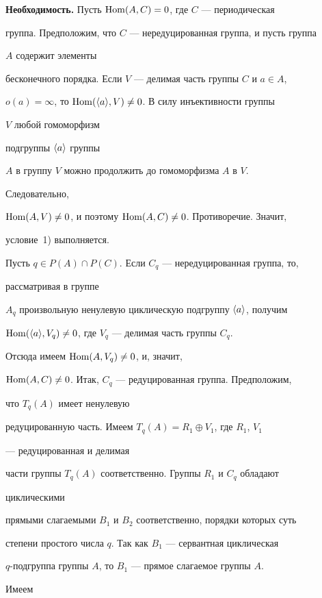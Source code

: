 \begin{pf} 


{\bf Необходимость.} Пусть $\operatorname{Hom}(A,C)=0$, где $C$ --- периодическая 


группа. Предположим, что $C$ --- нередуцированная группа, и пусть группа 


$A$ содержит элементы 


бесконечного порядка. Если $V$ --- делимая часть группы $C$ и $a\in A$, 


$o(a)=\infty$, то $\operatorname{Hom}(\langle a\rangle,V)\ne0$. В силу инъективности группы 


$V$ любой гомоморфизм 


подгруппы $\langle a\rangle$ группы 


$A$ в группу $V$ можно продолжить до гомоморфизма $A$ в $V$. 


Следовательно, 


$\operatorname{Hom}(A,V)\ne0$, и поэтому $\operatorname{Hom}(A,C)\ne0$. Противоречие. Значит, 


условие~1) выполняется. 


 


Пусть $q\in P(A)\cap P(C)$. Если $C_q$ --- нередуцированная группа, то, 


рассматривая в группе 


$A_q$ произвольную ненулевую циклическую подгруппу $\langle a\rangle$, получим 


$\operatorname{Hom}(\langle a\rangle,V_q)\ne0$, где $V_q$ --- делимая часть группы $C_q$. 


Отсюда имеем $\operatorname{Hom}(A,V_q)\ne0$, и, значит, 


$\operatorname{Hom}(A,C)\ne0$. Итак, $C_q$ --- редуцированная группа. Предположим, 


что $T_q(A)$ имеет ненулевую 


редуцированную часть. Имеем $T_q(A)=R_1\oplus V_1$, где $R_1$, $V_1$ 


--- редуцированная и делимая 


части группы $T_q(A)$ соответственно. Группы $R_1$ и $C_q$ обладают 


циклическими 


прямыми слагаемыми $B_1$ и $B_2$ соответственно, порядки которых суть 


степени простого числа $q$. Так как $B_1$ --- сервантная циклическая 


$q$-подгруппа группы $A$, то $B_1$ --- прямое слагаемое группы $A$. 


Имеем 


\begin{multline*} 



\end{multline*}
\end{pf}

